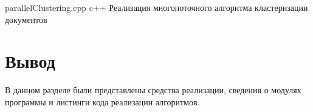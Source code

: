 \clearpage

{parallelClustering.cpp} %
{c++} %
{Реализация многопоточного алгоритма кластеризации документов} %

\section *{Вывод}

В данном разделе были представлены средства реализации, сведения о модулях программы и листинги кода реализации алгоритмов.
